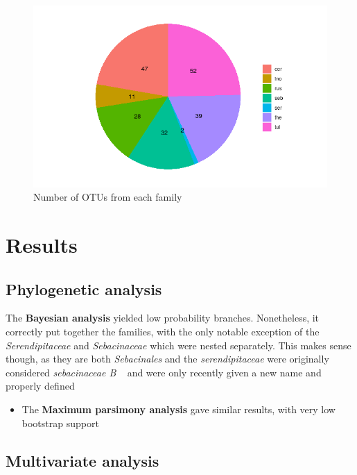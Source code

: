 \begin{figure}[htbp]
\centering
\includegraphics[keepaspectratio,width=\textwidth,height=0.75\textheight]{images/clust.png}
\caption{Number of OTUs from each family}
\end{figure}

\part{Results}
\label{results}

\chapter{Phylogenetic analysis}
\label{phylogeneticanalysis}

The \textbf{Bayesian analysis} yielded low probability branches. Nonetheless, it correctly put together the families, with the only notable exception of the \emph{Serendipitaceae} and \emph{Sebacinaceae} which were nested separately. This makes sense though, as they are both \emph{Sebacinales} and the \emph{serendipitaceae} were originally considered \emph{sebacinaceae B} ~\citep{weiss2004} and were only recently given a new name and properly defined ~\citep{weiss2016}

\begin{itemize}
\item The \textbf{Maximum parsimony analysis} gave similar results, with very low bootstrap support

\end{itemize}

\chapter{Multivariate analysis}
\label{multivariateanalysis}

